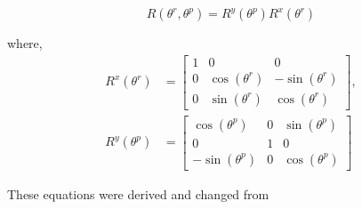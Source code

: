 \documentclass{report}
\begin{document}
\begin{equation}
  R(\theta^r, \theta^p) = R^y(\theta^p)R^x(\theta^r)
\end{equation}

where, 
\begin{align}
  R^x(\theta^r) &= \begin{bmatrix}
  1 & 0 & 0 \\
  0 & \cos(\theta^r) & -\sin(\theta^r) \\
  0 & \sin(\theta^r) & \cos(\theta^r)
  \end{bmatrix}, \\
  R^y(\theta^p) &= \begin{bmatrix}
  \cos(\theta^p) & 0 & \sin(\theta^p)\\
  0 & 1 & 0 \\
  -\sin(\theta^p) & 0 & \cos(\theta^p)
  \end{bmatrix}
\end{align}

These equations were derived and changed from \cite{positionControl}
\end{document}
